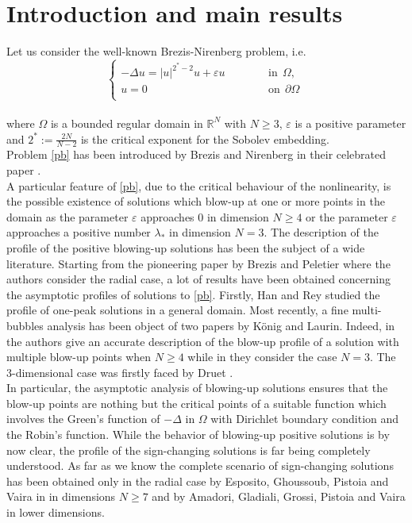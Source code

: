 \documentclass[11pt,a4paper]{amsart}
\newcommand{\e}{\varepsilon}
\theoremstyle{definition}
\renewcommand{\(}{\left(}
\renewcommand{\)}{\right)}
\begin{document}
\section{Introduction and main results}
\noindent Let us consider the well-known 
Brezis-Nirenberg problem, i.e.   
\begin{equation}\label{pb}
\begin{cases}
- \Delta u = |u|^{2^*-2}u + \varepsilon u \ \ \ \ \ \ \ \ \ \ \ \ \ \  & \mbox{in}\ \ \Omega, \\
u= 0 \ \ \ \ \ \ \ \ \ \ \ \ \ \ \ \ & \mbox{on} \ \ \partial \Omega \ \\ 
\end{cases}
\end{equation} \\ 
where $\Omega$ is a bounded regular domain in $\mathbb{R}^{N}$ with $N\geq 3$, $\varepsilon$ is a positive parameter and $2^*:=\frac{2N}{N-2}$ is the critical exponent for the Sobolev embedding. \\
Problem \eqref{pb} has been  introduced by Brezis and Nirenberg in their celebrated paper \cite{BN}.\\
A particular feature of \eqref{pb}, due to the critical behaviour of the nonlinearity, is the possible existence of solutions which blow-up at one or more points in the domain as the parameter $\e$ approaches $0$ in dimension $N\geq 4$ or the parameter $\e$ approaches a positive number $\lambda_*$ in dimension $N=3$. The description
of the profile of the positive blowing-up solutions has been the subject of a wide
literature. Starting from the pioneering paper by Brezis and Peletier \cite{BP} where
the authors consider the radial case, a lot of results have been obtained concerning the asymptotic profiles of solutions to \eqref{pb}. Firstly, Han \cite{H} and Rey \cite{R} studied the profile of one-peak solutions in a
general domain. Most recently, a fine multi-bubbles analysis has been object of two papers by K\"onig and Laurin. Indeed, in \cite{KL1} the authors give an accurate description of the
blow-up profile of a solution with multiple blow-up points when $N\geq 4$ while in \cite{KL2} they consider the case $N=3$. The  3-dimensional case was firstly faced by Druet \cite{D}. \\ In particular, the asymptotic analysis of blowing-up solutions ensures that the
blow-up points are nothing but the critical points of a suitable function which
involves the Green’s function of $-\Delta$ in $\Omega$  with Dirichlet boundary
condition and the Robin’s function.
While the behavior of blowing-up positive solutions is by now clear, the profile
of the sign-changing solutions is far being completely understood. As far as we
know the complete scenario of sign-changing solutions has been obtained only in
the radial case by Esposito, Ghoussoub, Pistoia and Vaira in \cite{EGPV} in dimensions $N\geq 7$
and by Amadori, Gladiali, Grossi, Pistoia and Vaira \cite{AGGPV} in lower dimensions.\\
\end{document}
